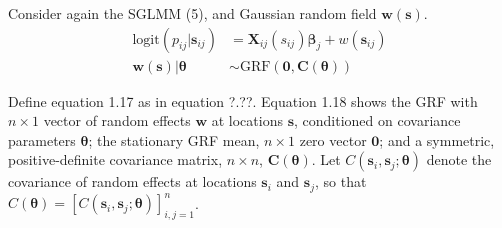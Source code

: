 Consider again the SGLMM (5), and Gaussian random field $\pmb{w}(\pmb{s})$.
\begin{align}
\text{logit}(p_{ij}|\pmb{s}_{ij}) &= \pmb{X}_{ij}(s_{ij}) \pmb{\beta}_{j} + w(\pmb{s}_{ij}) \\
\pmb{w}(\pmb{s}) | \pmb{\theta} &\sim \text{GRF}(\pmb{0}, \pmb{C}(\pmb{\theta}))
\end{align}

Define equation 1.17 as in equation ?.??. Equation 1.18 shows the GRF with $n \times 1$ vector of random effects $\pmb{w}$ at locations $\pmb{s}$, conditioned on covariance parameters $\pmb{\theta}$; the stationary GRF mean, $n \times 1$ zero vector $\pmb{0}$; and a symmetric, positive-definite covariance matrix, $n \times n$,  $\pmb{C}(\pmb{\theta})$. Let $C(\pmb{s}_{i}, \pmb{s}_{j}; \pmb{\theta})$ denote the covariance of random effects at locations $\pmb{s}_{i}$ and $\pmb{s}_{j}$, so that $C(\pmb{\theta}) = [C(\pmb{s}_{i}, \pmb{s}_{j}; \pmb{\theta})]_{i,j=1}^{n}$.

